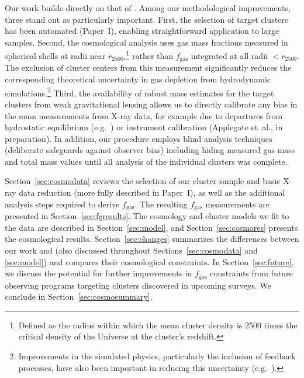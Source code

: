 \documentclass[useAMS,usenatbib,usegraphicx]{mn2e}
\newcommand*{\mysub}[2]{\ensuremath{#1_{\mathrm{#2}}}}
\newcommand*{\fgas}{\mysub{f}{gas}}
\newcommand*{\secref}{Section}
\newcommand*{\arsemf}{\citetalias{Allen0706.0033}}
\newcommand*{\wtg}{\citetalias{von-der-Linden1208.0597}}
\newcommand*{\morphpaper}{Paper~I}
\begin{document}
Our work builds directly on that of \citet{Allen0205007, Allen0405340, Allen0706.0033}. Among our methodological improvements, three stand out as particularly important. First, the selection of target clusters has been automated (\morphpaper{}), enabling straightforward application to large samples. Second, the cosmological analysis uses gas mass fractions measured in spherical shells at radii near $r_{2500}$,\footnote{Defined as the radius within which the mean cluster density is 2500 times the critical density of the Universe at the cluster's redshift.} rather than \fgas{} integrated at all radii $<r_{2500}$. The exclusion of cluster centers from this measurement significantly reduces the corresponding theoretical uncertainty in  gas depletion from hydrodynamic simulations.\footnote{Improvements in the simulated physics, particularly the inclusion of feedback processes, have also been important in reducing this uncertainty (e.g.\ \citealt{Battaglia1209.4082, Planelles1209.5058}).} Third, the availability of robust mass estimates for the target clusters from weak gravitational lensing \citep[][hereafter collectively Weighing the Giants, or \wtg{}]{von-der-Linden1208.0597, Kelly1208.0602, Applegate1208.0605} allows us to directly calibrate any bias in the mass measurements from X-ray data, for example due to departures from hydrostatic equilibrium (e.g.\ \citealt{Rasia0602434, Nagai0609247, Battaglia1209.4082}) or instrument calibration (Applegate et~al., in preparation). In addition, our procedure employs blind analysis techniques (deliberate safeguards against observer bias) including hiding measured gas mass and total mass values until all analysis of the individual clusters was complete.

\secref~\ref{sec:cosmodata} reviews the selection of our cluster sample and basic X-ray data reduction (more fully described in \morphpaper{}), as well as the additional analysis steps required to derive \fgas{}. The resulting \fgas{} measurements are presented in \secref~\ref{sec:fgresults}. The cosmology and cluster models we fit to the data are described in \secref~\ref{sec:model}, and \secref{}~\ref{sec:cosmores} presents the cosmological results. \secref~\ref{sec:changes} summarizes the differences between our work and \arsemf{} (also discussed throughout \secref{}s~\ref{sec:cosmodata} and \ref{sec:model}) and compares their cosmological constraints. In \secref~\ref{sec:future}, we discuss the potential for further improvements in \fgas{} constraints from future observing programs targeting clusters discovered in upcoming surveys. We conclude in \secref~\ref{sec:cosmosummary}.
\end{document}
